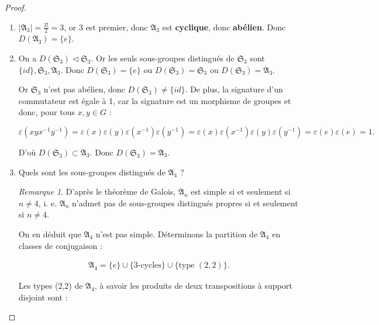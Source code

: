 \documentclass[french]{book}
\theoremstyle{definition}
\theoremstyle{remark}
\newtheorem*{remark}{Remarque}
\begin{document}
\begin{proof}

  \

  \begin{enumerate}
    \item \(\left\lvert \mathfrak{A}_3 \right\rvert = \frac{3!}{2}=3\), or 3 est premier, donc \(\mathfrak{A}_3\) est \textbf{cyclique}, donc \textbf{abélien}. Donc \(D(\mathfrak{A}_{3}) = \{ e \}\).
    \item On a \(D(\mathfrak{S}_{3}) \triangleleft \mathfrak{S}_3\). Or les seuls sous-groupes distingués de \(\mathfrak{S}_{3}\) sont \(\{ id \}, \mathfrak{S}_{3}, \mathfrak{A}_3\). Donc \(D(\mathfrak{S}_{3}) = \{ e \} \text{ ou } D(\mathfrak{S}_{3}) = \mathfrak{S}_{3} \text{ ou } D(\mathfrak{S}_{3}) = \mathfrak{A}_{3}\).

    Or \(\mathfrak{S}_{3}\) n'est pas abélien, donc \(D(\mathfrak{S}_{3}) \neq \{ id \}\). De plus, la signature d'un commutateur est égale à 1, car la signature est un morphisme de groupes et donc, pour tous \(x, y \in G\) :

    \[\varepsilon(x y x ^{-1} y ^{-1}) = \varepsilon(x) \varepsilon(y) \varepsilon(x ^{-1}) \varepsilon(y ^{-1}) = \varepsilon(x) \varepsilon(x ^{-1}) \varepsilon(y) \varepsilon(y ^{-1}) = \varepsilon(e)\varepsilon(e) = 1.\]

    D'où \(D(\mathfrak{S}_{3}) \subset \mathfrak{A}_3\). Donc \(D(\mathfrak{S}_{3}) = \mathfrak{A}_3\).

    \item Quels sont les sous-groupes distingués de \(\mathfrak{A}_{4}\) ?

    \begin{remark}
      D'après le théorème de Galois, \(\mathfrak{A}_n\) est simple si et seulement si \(n \neq 4\), i. e. \(\mathfrak{A}_n\) n'admet pas de sous-groupes distingués propres si et seulement si \(n \neq 4\).
    \end{remark}

    On en déduit que \(\mathfrak{A}_4\) n'est pas simple. Déterminons la partition de \(\mathfrak{A}_4\) en classes de conjugaison :

    \begin{gather*}
      \mathfrak{A}_4 = \{ e \} \cup \{ 3\text{-cycles} \} \cup \{ \text{type } (2, 2)\}.
    \end{gather*}

    Les types (2,2) de \(\mathfrak{A}_{4}\), à savoir les produits de deux transpositions à support disjoint sont :


\end{enumerate}
\end{proof}
\end{document}
